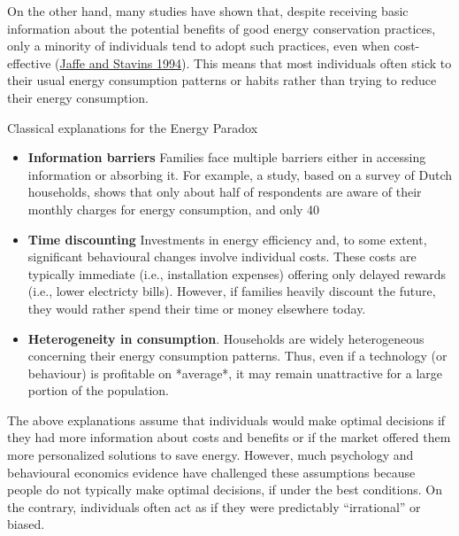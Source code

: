 \documentclass[
  11pt,
]{article}
\begin{document}
On the other hand, many studies have shown that, despite receiving basic
information about the potential benefits of good energy conservation
practices, only a minority of individuals tend to adopt such practices,
even when cost-effective (\protect\hyperlink{ref-jaffe1994energy}{Jaffe
and Stavins 1994}). This means that most individuals often stick to
their usual energy consumption patterns or habits rather than trying to
reduce their energy consumption.

\begin{keypoints}
Classical explanations for the Energy Paradox
\begin{itemize}

\item \textbf{Information barriers} Families face multiple barriers either in accessing information or absorbing it. For example, a study, based on a survey of Dutch households, shows that only about half of respondents are aware of their monthly charges for energy consumption, and only 40%

\item \textbf{Time discounting} Investments in energy efficiency and, to some extent, significant behavioural changes involve individual costs. These costs are typically immediate (i.e., installation expenses) offering only delayed rewards (i.e., lower electricty bills). However, if families heavily discount the future, they would rather spend their time or money elsewhere today.

\item \textbf{Heterogeneity in consumption}. Households are widely heterogeneous concerning their energy consumption patterns. Thus, even if a technology (or behaviour) is profitable on *average*, it may remain unattractive for a large portion of the population.

\end{itemize}
\end{keypoints}

The above explanations assume that individuals would make optimal
decisions if they had more information about costs and benefits or if
the market offered them more personalized solutions to save energy.
However, much psychology and behavioural economics evidence have
challenged these assumptions because people do not typically make
optimal decisions, if under the best conditions. On the contrary,
individuals often act as if they were predictably ``irrational'' or
biased.
\end{document}

